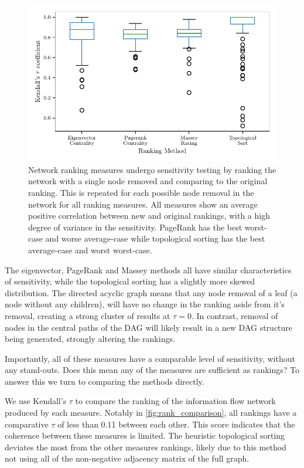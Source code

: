 \begin{figure}[!htbp]
\centering
\includegraphics{chapter4/figs/removal_ranking_boxplot.pdf}
\caption{Network ranking measures undergo sensitivity testing by ranking the network with a single node removed and comparing to the original ranking. This is repeated for each possible node removal in the network for all ranking measures. All measures show an average positive correlation between new and original rankings, with a high degree of variance in the sensitivity. PageRank has the best worst-case and worse average-case while topological sorting has the best average-case and worst worst-case.}\label{fig:rank_boxplots}
\end{figure}

The eigenvector, PageRank and Massey methods all have similar characteristics of sensitivity, while the topological sorting has a slightly more skewed distribution. The directed acyclic graph means that any node removal of a leaf (a node without any children), will have no change in the ranking aside from it's removal, creating a strong cluster of results at $\tau=0$. In contrast, removal of nodes in the central paths of the DAG will likely result in a new DAG structure being generated, strongly altering the rankings.

Importantly, all of these measures have a comparable level of sensitivity, without any stand-outs. Does this mean any of the measures are sufficient as rankings? To answer this we turn to comparing the methods directly.

We use Kendall's $\tau$ to compare the ranking of the information flow network produced by each measure. Notably in \autoref{fig:rank_comparison}, all rankings have a comparative $\tau$ of less than 0.11 between each other. This score indicates that the coherence between these measures is limited. The heuristic topological sorting deviates the most from the other measures rankings, likely due to this method not using all of the non-negative adjacency matrix of the full graph.

